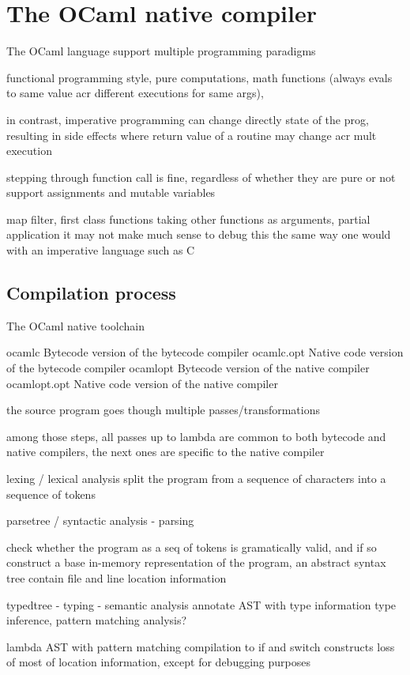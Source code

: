 \chapter{The OCaml native compiler}

The OCaml language support multiple programming paradigms

functional programming style, pure computations, math functions (always evals to same value acr
different executions for same args),

in contrast, imperative programming can change directly state of the prog,
resulting in side effects where return value of a routine may change acr mult
execution

stepping through function call is fine, regardless of whether they are pure or
not
support assignments and mutable variables

map filter, first class functions taking other functions as arguments, partial
application it may not make much sense to debug this the same way one would with
an imperative language such as C

\section{Compilation process}

The OCaml native toolchain

ocamlc Bytecode version of the bytecode compiler
ocamlc.opt Native code version of the bytecode compiler
ocamlopt Bytecode version of the native compiler
ocamlopt.opt Native code version of the native compiler

the source program goes though multiple passes/transformations

among those steps, all passes up to lambda are common to both bytecode and
native compilers, the next ones are specific to the native compiler

lexing / lexical analysis
split the program from a sequence of characters into a sequence of tokens

parsetree / syntactic analysis - parsing

check whether the program as a seq of tokens is gramatically valid, and if so
construct a base in-memory representation of the program, an abstract syntax
tree
contain file and line location information

typedtree - typing - semantic analysis
annotate AST with type information
type inference, pattern matching analysis?

lambda
AST with pattern matching compilation to if and switch constructs
loss of most of location information, except for debugging purposes

